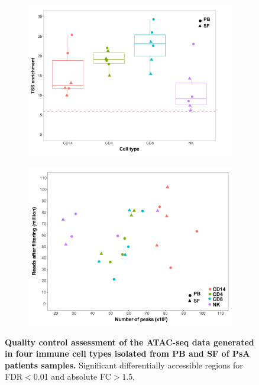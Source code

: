 \begin{figure}[H]
\begin{subfigure}[b]{0.48\textwidth}
\includegraphics[width=\textwidth]{./Results3/pdfs/ATAC_PSA_all_TSS_max_per_cell_type}%
\caption{}
\end{subfigure}
\begin{subfigure}[b]{0.48\textwidth} 
\centering
\includegraphics[width=\textwidth]{./Results3/pdfs/ATAC_PSA_all_peaks_vs_num_reads}%
\caption{}
\end{subfigure}
\caption[Quality control assessment of the ATAC-seq data generated in four immune cell types isolated from PB and SF of PsA patients samples.]{\textbf{Quality control assessment of the ATAC-seq data generated in four immune cell types isolated from PB and SF of PsA patients samples.} Significant differentially accessible regions for FDR$<$0.01 and absolute FC$>$1.5.}
\label{figure:PsA_FAST_ATAC_QC}
\end{figure}

